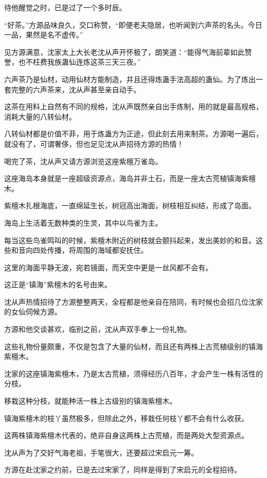 \begin{this_body}
待他醒觉之时，已是过了一个多时辰。

“好茶。”方源品味良久，交口称赞，“即便老夫隐居，也听闻到六声茶的名头。今日一品，果然是名不虚传。”

见方源满意，沈家太上大长老沈从声开怀极了，朗笑道：“能得气海前辈如此赞誉，也不枉费我族蛊仙连炼这茶三天三夜。”

六声茶乃是仙材，动用仙材方能制造，并且还得炼蛊手法高超的蛊仙。为了炼出一套完整的六声茶来，沈从声甚至亲自动手。

这茶在用料上自然有不同的规格，沈从声既然亲自出手炼制，用的就是最高规格，消耗大量的八转仙材。

八转仙材都是价值不菲，用于炼蛊方为正途，但此刻去用来制茶。方源喝一遍后，就没有了，可谓奢侈，但也足见沈从声招待方源的热情！

喝完了茶，沈从声又请方源浏览这座紫檀万雀岛。

这座海岛本身就是一座超级资源点，海岛并非土石，而是一座太古荒植镇海紫檀木。

紫檀木扎根海底，一直绵延生长，树冠高出海面，树枝相互纠结，形成了岛面。

海岛上生活着无数种类的生灵，其中以鸟雀为主。

每当这些鸟雀鸣叫的时候，紫檀木附近的树枝就会颤抖起来，发出美妙的和音。这些和音向四处传播，将周围的海域都安抚住。

这里的海面平静无波，宛若镜面，而天空中更是一丝风都不会有。

这正是“镇海”紫檀木的名号由来。

沈从声热情招待了方源整整两天，全程都是他亲自在陪同，有时候也会招几位沈家的女仙伺候方源。

方源和他交谈甚欢，临别之前，沈从声双手奉上一份礼物。

这些礼物份量颇重，不仅是包含了大量的仙材，而且还有两株上古荒植级别的镇海紫檀木。

沈家的这座镇海紫檀木，乃是太古荒植，须得经历八百年，才会产生一株有活性的分枝。

移栽这种分枝，就能种活一株上古级别的镇海紫檀木。

镇海紫檀木的枝丫虽然极多，但除此之外，移栽任何枝丫都不会有什么收获。

这两株镇海紫檀木代表的，绝非自身这两株上古荒植，而是两处大型资源点。

沈从声为了交好气海老祖，手笔很大，还要超过宋启元一筹。

方源在赴沈家之约前，已是去过宋家了，同样是得到了宋启元的全程招待。


\end{this_body}
